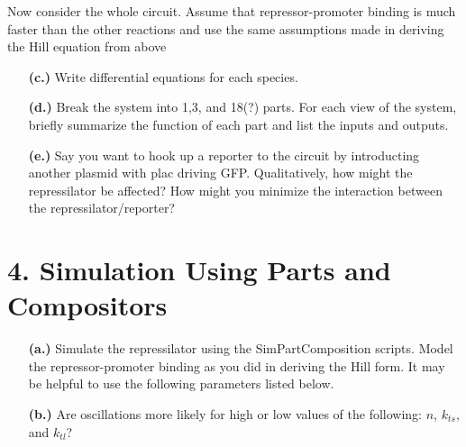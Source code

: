 \documentclass[11pt]{article}
\begin{document}
Now consider the whole circuit. Assume that repressor-promoter binding is much faster than the other reactions and use the same assumptions made in deriving the Hill equation from above

\begin{itemize}

\item[{\bf (c.)}] Write differential equations for each species.

\item[{\bf (d.)}] Break the system into 1,3, and 18(?) parts. For each view of the system, briefly summarize the function of each part and list the inputs and outputs.


\item[{\bf (e.)}] Say you want to hook up a reporter to the circuit by introducting another plasmid with plac driving GFP. 
 Qualitatively, how might the repressilator be affected? 
How might you minimize the interaction between the repressilator/reporter?

\end{itemize}

\newpage
\section*{4. Simulation Using Parts and Compositors}

\begin{itemize}
\item[{\bf (a.)}] Simulate the repressilator using the SimPartComposition scripts. 
Model the repressor-promoter binding as you did in deriving the Hill form. 
It may be helpful to use the following parameters listed below.

\item[{\bf (b.)}] Are oscillations more likely for high or low values of the following: $n$, $k_{ts}$, and $k_{tl}$?  
\end{itemize}
\end{document}
